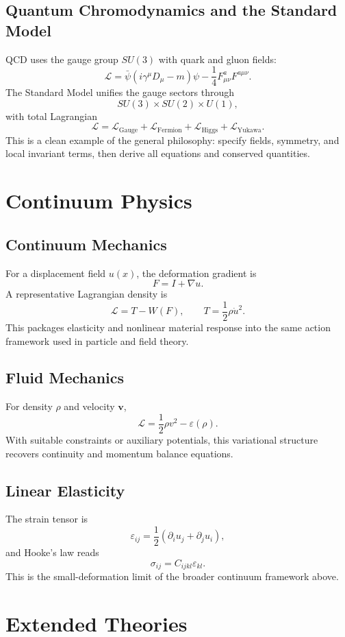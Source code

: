 \documentclass[11pt]{article}
\newcommand{\Lag}{\mathcal{L}}
\begin{document}
\subsection{Quantum Chromodynamics and the Standard Model}
QCD uses the gauge group $SU(3)$ with quark and gluon fields:
\[
\boxed{
\Lag=
\bar\psi(i\gamma^\mu D_\mu-m)\psi
-\frac14 F_{\mu\nu}^a F^{a\mu\nu}.
}
\]
The Standard Model unifies the gauge sectors through
\[
SU(3)\times SU(2)\times U(1),
\]
with total Lagrangian
\[
\boxed{
\Lag=
\Lag_{\mathrm{Gauge}}
+\Lag_{\mathrm{Fermion}}
+\Lag_{\mathrm{Higgs}}
+\Lag_{\mathrm{Yukawa}}.
}
\]
This is a clean example of the general philosophy: specify fields, symmetry,
and local invariant terms, then derive all equations and conserved quantities.

\section{Continuum Physics}
\subsection{Continuum Mechanics}
For a displacement field $u(x)$, the deformation gradient is
\[
F=I+\nabla u.
\]
A representative Lagrangian density is
\[
\boxed{
\Lag=T-W(F),
}
\qquad
T=\frac12 \rho \dot u^2.
\]
This packages elasticity and nonlinear material response into the same action
framework used in particle and field theory.

\subsection{Fluid Mechanics}
For density $\rho$ and velocity $\mathbf v$,
\[
\boxed{
\Lag=\frac12 \rho v^2-\varepsilon(\rho).
}
\]
With suitable constraints or auxiliary potentials, this variational structure
recovers continuity and momentum balance equations.

\subsection{Linear Elasticity}
The strain tensor is
\[
\varepsilon_{ij}=\frac12(\partial_i u_j+\partial_j u_i),
\]
and Hooke's law reads
\[
\sigma_{ij}=C_{ijkl}\varepsilon_{kl}.
\]
This is the small-deformation limit of the broader continuum framework above.

\section{Extended Theories}
\end{document}
